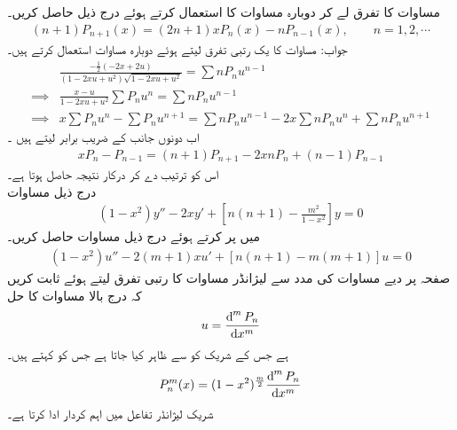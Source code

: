 مساوات  کا  تفرق لے کر دوبارہ مساوات  کا استعمال کرتے ہوئے  درج ذیل  حاصل کریں۔
\begin{align}
(n+1)P_{n+1}(x)=(2n+1)xP_n(x)-nP_{n-1}(x),\quad \quad n=1,2,\cdots
\end{align}
جواب: مساوات  کا یک رتبی تفرق  لیتے ہوئے دوبارہ مساوات  استعمال کرتے ہیں۔
\begin{align*}
& \frac{-\frac{1}{2}(-2x+2u)}{(1-2xu+u^2)\sqrt{1-2xu+u^2}}=\sum nP_nu^{n-1}\\
\implies & \frac{x-u}{1-2xu+u^2} \sum P_n u^n=\sum nP_n u^{n-1} \\
\implies & x\sum P_n u^n-\sum P_n u^{n+1}=\sum nP_n u^{n-1}-2x\sum nP_nu^n+\sum nP_nu^{n+1}
\end{align*}
اب دونوں جانب   کے  ضریب  برابر لیتے ہیں ۔
\begin{align*}
xP_n-P_{n-1}=(n+1)P_{n+1}-2xnP_n+(n-1)P_{n-1}
\end{align*}
اس کو ترتیب دے کر درکار نتیجہ  حاصل ہوتا ہے۔
\quad {}\\
درج ذیل مساوات 
\begin{align}\label{مساوات_بیسل_شریک_لیژانڈر_الف}
(1-x^2)y''-2xy'+\left[n(n+1)-\frac{m^2}{1-x^2}\right]y=0
\end{align}
میں  پر کرتے ہوئے درج ذیل مساوات حاصل کریں۔
\begin{align}\label{مساوات_بیسل_شریک_لیژانڈر_ب}
(1-x^2)u''-2(m+1)xu'+[n(n+1)-m(m+1)]u=0
\end{align}
صفحہ  پر دیے مساوات  کی مدد سے لیژانڈر مساوات  کا  رتبی تفرق  لیتے ہوئے ثابت کریں کہ درج بالا مساوات کا حل
\begin{align*}
u=\frac{\dif^{\,m}P_n}{\dif x^m}
\end{align*}
ہے جس کے شریک  کو  سے ظاہر کیا جاتا ہے جس کو  کہتے ہیں۔
\begin{align}
P_n^m(x) =(1-x^2)^{\frac{m}{2}}\frac{\dif^{\,m}P_n}{\dif x^m}
\end{align}
شریک لیژانڈر تفاعل  میں اہم کردار ادا کرتا ہے۔

